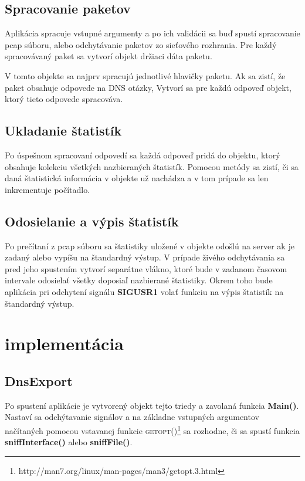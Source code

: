\documentclass{article}
\begin{document}
        \subsection{Spracovanie paketov}
        Aplikácia spracuje vstupné argumenty a po ich validácii sa buď spustí spracovanie pcap súboru, alebo odchytávanie
        paketov zo sieťového rozhrania. Pre každý spracovávaný paket sa vytvorí objekt držiaci dáta paketu.

        V tomto objekte sa najprv spracujú jednotlivé hlavičky paketu. Ak sa zistí, že paket obsahuje odpovede na DNS otázky,
        Vytvorí sa pre každú odpoveď objekt, ktorý tieto odpovede spracováva.

        \subsection{Ukladanie štatistík}
        Po úspešnom spracovaní odpovedí sa každá odpoveď pridá do objektu, ktorý obsahuje kolekciu všetkých nazbieraných štatistík.
        Pomocou metódy sa zistí, či sa daná štatistická informácia v objekte už nachádza a v tom prípade sa len inkrementuje počítadlo.
        
        \subsection{Odosielanie a výpis štatistík}
        Po prečítaní z pcap súboru sa štatistiky uložené v objekte odošlú na server ak je zadaný alebo vypíšu na štandardný výstup.
        V prípade živého odchytávania sa pred jeho spustením vytvorí separátne vlákno, ktoré bude v zadanom časovom intervale
        odosielať všetky doposiaľ nazbierané štatistiky. Okrem toho bude aplikácia pri odchytení signálu \textbf{SIGUSR1} volať funkciu
        na výpis štatistík na štandardný výstup.
        
    \section{implementácia}
    
        \subsection{DnsExport}
        Po spustení aplikácie je vytvorený objekt tejto triedy a zavolaná funkcia \textbf{Main()}. Nastaví sa odchýtavanie signálov
        a na základne vstupných argumentov načítaných pomocou vstavanej funkcie \textsc{getopt()}\footnote{http://man7.org/linux/man-pages/man3/getopt.3.html} sa rozhodne, či sa spustí funkcia
        \textbf{sniffInterface()} alebo \textbf{sniffFile()}. 
        
\end{document}

